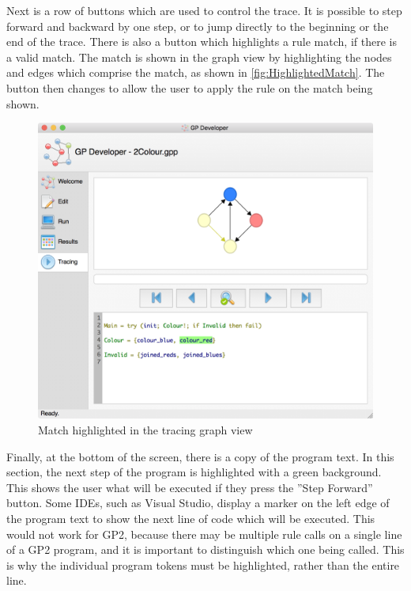 \documentclass[authoryearcitations]{UoYCSproject}
\newenvironment{nscenter}
    {\parskip=0pt\par\nopagebreak\centering}
    {\par\noindent\ignorespacesafterend}
\begin{document}
Next is a row of buttons which are used to control the trace. It is possible to
step forward and backward by one step, or to jump directly to the beginning or the
end of the trace. There is also a button which highlights a rule match, if there
is a valid match. The match is shown in the graph view by highlighting the nodes
and edges which comprise the match, as shown in \autoref{fig:HighlightedMatch}.
The button then changes to allow the user to apply the rule on the match being shown.

\begin{figure}[!htb]
    \begin{nscenter}
        \includegraphics[width=\textwidth]{HighlightedMatch}
    \end{nscenter}
    \caption{Match highlighted in the tracing graph view}
    \label{fig:HighlightedMatch}
\end{figure}

Finally, at the bottom of the screen, there is a copy of the program text. In this
section, the next step of the program is highlighted with a green background. This
shows the user what will be executed if they press the ''Step Forward'' button. Some
IDEs, such as Visual Studio, display a marker on the left edge of the program text
to show the next line of code which will be executed. This would not work for GP2,
because there may be multiple rule calls on a single line of a GP2 program, and it
is important to distinguish which one being called. This is why the individual
program tokens must be highlighted, rather than the entire line.
\end{document}
